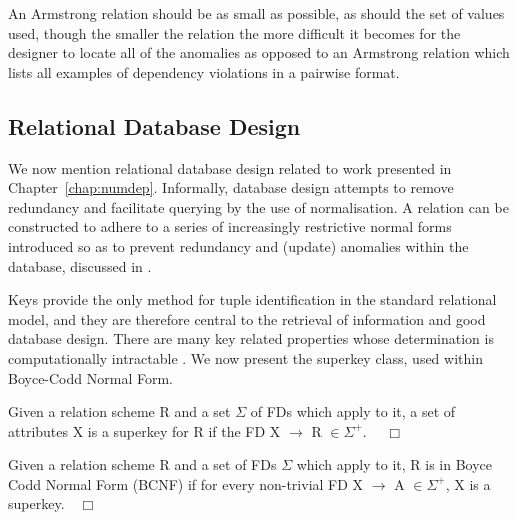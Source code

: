 An Armstrong relation should be as small as possible, as should the
set of values used, though the smaller the relation the more difficult
it becomes for the designer to locate all of the anomalies as opposed
to an Armstrong relation which lists all examples of dependency
violations in a pairwise format.\\ 

\subsection{Relational Database Design}\label{subsec:reldbdes}
			
We now mention relational
database design related to work presented in
Chapter~\ref{chap:numdep}. Informally, database design attempts to
remove redundancy and facilitate querying by the use of normalisation.
A relation can be 
constructed to adhere to a series of increasingly restrictive normal forms introduced so as to prevent redundancy and (update) anomalies within the
database, discussed in
\cite{cod72,databasefound,atze93,Date95,Maier83,Ullm88}.  

\medskip

Keys provide the only method for tuple identification  in the standard
relational model, and they are
therefore central to the retrieval of information and good database design. There are many key
related properties whose determination is computationally intractable
\cite{lo78}. We now present the superkey class, used within Boyce-Codd
Normal Form.

\begin{definition}[SuperKey]
\begin{rm}
Given a relation scheme R and a set  $\Sigma$ of FDs which apply to
it, a  set of attributes X is a superkey for R if the FD X $\to$ R
$\in \Sigma^+$. $\quad\Box$ 
\end{rm}
\end{definition}

\begin{definition}\label{def:bcnf}
\begin{rm}
Given a relation scheme R and a set of FDs $\Sigma$ which apply to it,
R is in Boyce Codd Normal Form (BCNF) if for every non-trivial FD X
$\to$ A $\in \Sigma^+$, X is a superkey.$\quad\Box$ 
\end{rm}
\end{definition}


